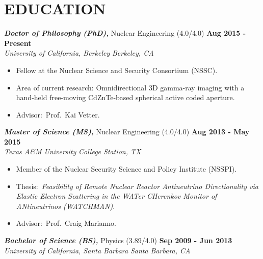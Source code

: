 \section{\small{EDUCATION}}

{\sl\bf Doctor of Philosophy (PhD),} Nuclear Engineering (4.0/4.0) \hfill {\bf Aug 2015 - Present}\\
{\sl University of California, Berkeley} \hfill {\sl Berkeley, CA}
\vspace{2.5pt}
\begin{itemize}[leftmargin=4ex] \itemsep -2pt %
\item Fellow at the Nuclear Science and Security Consortium (NSSC).
\item Area of current research: Omnidirectional 3D gamma-ray imaging with a hand-held free-moving CdZnTe-based spherical active coded aperture.
\item Advisor:~Prof.~Kai Vetter.
\end{itemize}

{\sl\bf Master of Science (MS),} Nuclear Engineering (4.0/4.0) \hfill {\bf Aug 2013 - May 2015}\\
{\sl Texas A\&M University} \hfill {\sl College Station, TX}
\vspace{2.5pt}
\begin{itemize}[leftmargin=4ex] \itemsep -2pt %
\item Member of the Nuclear Security Science and Policy Institute (NSSPI).
\item Thesis:~\emph{Feasibility of Remote Nuclear Reactor Antineutrino Directionality via Elastic Electron Scattering in the WATer CHerenkov Monitor of ANtineutrinos (WATCHMAN)}.
\item Advisor:~Prof.~Craig Marianno.
\end{itemize}

{\sl\bf Bachelor of Science (BS),} Physics (3.89/4.0) \hfill {\bf Sep 2009 - Jun 2013} \\
{\sl University of California, Santa Barbara} \hfill {\sl Santa Barbara, CA}
\vspace{2pt}
